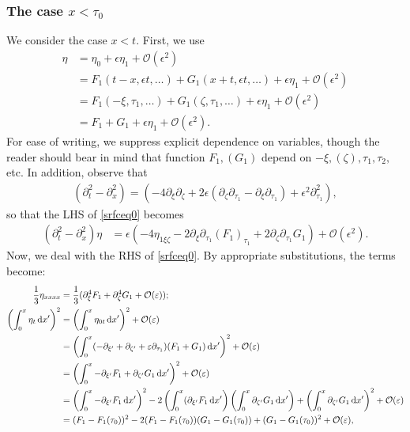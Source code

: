 \documentclass[10pt,reqno,oneside,a4paper, landscape]{article}
\begin{document}
\subsubsection{The case $x<\tau_0$}
We consider the case $x<t.$ First, we use
\begin{align*}
\eta &= \eta_0 + \epsilon \eta_1 + \mathcal{O}(\epsilon^2)  \\
&= F_1(t-x, \epsilon t, \ldots) + G_1(x+t, \epsilon t, \ldots) + \epsilon \eta_1 + \mathcal{O}(\epsilon^2) \\
&= F_1(-\xi, \tau_1, \ldots) + G_1(\zeta, \tau_1, \ldots) + \epsilon \eta_1 + \mathcal{O}(\epsilon^2) \\
&= F_1+G_1 + \epsilon \eta_1 +  \mathcal{O}(\epsilon^2).
\end{align*}
For ease of writing, we suppress explicit dependence on variables, though the reader should bear in mind that function $F_1, (G_1)$ depend on $-\xi, (\zeta), \tau_1, \tau_2,$ etc. In addition, observe that
\begin{align*}
(\partial_t^2 - \partial_x^2) = \left( - 4\partial_\xi \partial_\zeta + 2\epsilon(\partial_\zeta \partial_{\tau_1} - \partial_\xi\partial_{\tau_1}) + \epsilon^2 \partial_{\tau_1}^2 \right),
\end{align*}
so that the LHS of \eqref{srfceq0} becomes
\begin{align}
(\partial_t^2 - \partial_x^2) \eta &= \epsilon \left(- 4\eta_{1\xi \zeta} - 2\partial_{\xi}\partial_{\tau_1}(F_1)_{\tau_1} + 2\partial_\zeta \partial_{\tau_1}G_1 \right) + \mathcal{O}(\epsilon^2). \label{LHS1-1}
\end{align}
Now, we deal with the RHS of \eqref{srfceq0}. By appropriate substitutions, the terms become:
\begin{align*}
\frac{1}{3}\eta_{xxxx} &= \frac{1}{3}(\partial_\xi^4 F_1 + \partial_\zeta^4G_1+ \mathcal{O}(\varepsilon)); \\
\left( \int^{x}_{0} \eta_t \,\mathrm{d} x' \right)^2 &= \left( \int^{x}_{0} \eta_{0t} \,\mathrm{d} x' \right)^2 + \mathcal{O}(\varepsilon) \\
&= \left( \int^{x}_{0}(-\partial_{\xi'} + \partial_{\zeta'} + \varepsilon \partial_{\tau_1}) (F_1+G_1) \,\mathrm{d} x' \right)^2 + \mathcal{O}(\varepsilon)\\ 
&= \left( \int^{x}_{0} - \partial_{\xi'}F_1 + \partial_{\zeta'} G_1 \,\mathrm{d} x' \right)^2 + \mathcal{O}(\varepsilon)\\
&= \left( \int^{x}_{0} -\partial_{\xi'}F_1 \,\mathrm{d} x'\right)^2 - 2\left( \int^{x}_{0}( \partial_{\xi'} F_1 \,\mathrm{d} x'\right)\left( \int^{x}_{0}\partial_{\zeta'}G_1 \,\mathrm{d} x'\right) + \left( \int^{x}_{0} \partial_{\zeta'} G_1 \,\mathrm{d} x'\right)^2 + \mathcal{O}(\varepsilon) \\
&= (F_1 - F_1(\tau_0))^2 - 2(F_1 - F_1(\tau_0))(G_1 - G_1(\tau_0)) + (G_1 - G_1(\tau_0))^2 + \mathcal{O}(\varepsilon),
\end{align*}
\end{document}
